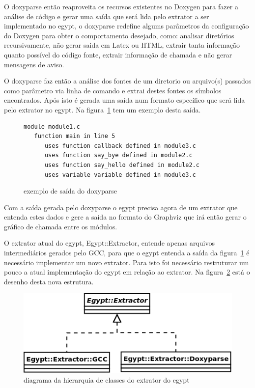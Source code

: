 O doxyparse então reaproveita os recursos existentes no Doxygen para fazer a
análise de código e gerar uma saída que será lida pelo extrator a ser
implementado no egypt, o doxyparse redefine algums parâmetros da configuração
do Doxygen para obter o comportamento desejado, como: analisar diretórios
recursivamente, não gerar saida em Latex ou HTML, extrair tanta informação
quanto possível do código fonte, extrair informação de chamada e não gerar
mensagens de aviso.

O doxyparse faz então a análise dos fontes de um diretorio ou arquivo(s)
passados como parâmetro via linha de comando e extrai destes fontes os símbolos
encontrados. Após isto é gerada uma saída num formato específico que será lida
pelo extrator no egypt. Na figura~\ref{exemplo-saida-doxyparse} tem um exemplo
desta saída.

\begin{figure}[h]
\begin{Verbatim}[frame=single,fontsize=\relsize{-2},fontfamily=courier]
module module1.c
   function main in line 5
      uses function callback defined in module3.c
      uses function say_bye defined in module2.c
      uses function say_hello defined in module2.c
      uses variable variable defined in module3.c
\end{Verbatim}
\caption{exemplo de saída do doxyparse}
\label{exemplo-saida-doxyparse}
\end{figure}

Com a saída gerada pelo doxyparse o egypt precisa agora de um extrator que
entenda estes dados e gere a saída no formato do Graphviz que irá então gerar o
gráfico de chamada entre os módulos.

O extrator atual do egypt, Egypt::Extractor, entende apenas arquivos
intermediários gerados pelo GCC, para que o egypt entenda a saída da
figura~\ref{exemplo-saida-doxyparse} é necessário implementar um novo extrator.
Para isto foi necessário restruturar um pouco a atual implementação do egypt em
relação ao extrator. Na figura~\ref{egypt-diagram-extractor} está o desenho
desta nova estrutura.

\begin{figure}[h]
\center
\includegraphics[scale=0.5]{imagens/egypt-diagram-extractor}
\caption{diagrama da hierarquia de classes do extrator do egypt}
\label{egypt-diagram-extractor}
\end{figure}

